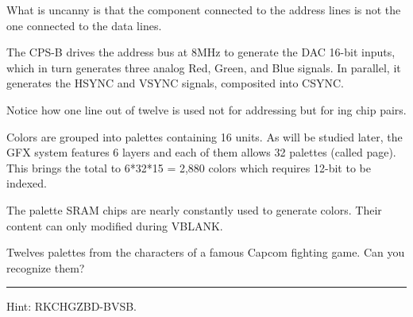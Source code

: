 What is uncanny is that the component connected to the address lines is not the one connected to the data lines.





The CPS-B drives the address bus at 8MHz to generate the DAC 16-bit inputs, which in turn generates three analog Red, Green, and Blue signals. In parallel, it generates the HSYNC and VSYNC signals, composited into CSYNC.

Notice how one line out of twelve is used not for addressing but for ing chip pairs. 








Colors are grouped into palettes containing 16 units. As will be studied later, the GFX system features 6 layers and each of them allows 32 palettes (called page). This brings the total to 6*32*15 = 2,880 colors which requires 12-bit to be indexed.

 The palette SRAM chips are nearly constantly used to generate colors. Their content can only modified during VBLANK.

\pagebreak




Twelves palettes from the characters of a famous Capcom fighting game. Can you recognize them?









\par\noindent\rule{\textwidth}{0.5pt}





Hint: RKCHGZBD-BVSB.














